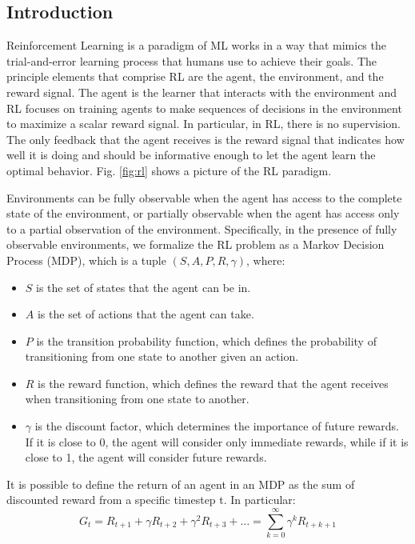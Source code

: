 \subsection{Introduction}
Reinforcement Learning is a paradigm of ML works in a way that mimics the trial-and-error learning process that humans use to achieve their goals.
The principle elements that comprise RL are the agent, the environment, and the reward signal.
The agent is the learner that interacts with the environment and RL focuses on training agents to make sequences of decisions in the environment to maximize a scalar reward signal.
In particular, in RL, there is no supervision.
The only feedback that the agent receives is the reward signal that indicates how well it is doing and should be informative enough to let the agent learn the optimal behavior.
Fig. \ref{fig:rl} shows a picture of the RL paradigm.

Environments can be fully observable when the agent has access to the complete state of the environment, or partially observable when the agent has access only to a partial observation of the environment.
Specifically, in the presence of fully observable environments, we formalize the RL problem as a Markov Decision Process (MDP), which is a tuple $(S, A, P, R, \gamma)$, where:
\begin{itemize}
    \item $S$ is the set of states that the agent can be in.
    \item $A$ is the set of actions that the agent can take.
    \item $P$ is the transition probability function, which defines the probability of transitioning from one state to another given an action.
    \item $R$ is the reward function, which defines the reward that the agent receives when transitioning from one state to another.
    \item $\gamma$ is the discount factor, which determines the importance of future rewards.
    If it is close to 0, the agent will consider only immediate rewards, while if it is close to 1, the agent will consider future rewards.
\end{itemize}

It is possible to define the return of an agent in an MDP as the sum of discounted reward from a specific timestep t.
In particular:
\begin{equation} \label{eq:return}
    G_t = R_{t+1} + \gamma R_{t+2} + \gamma^2 R_{t+3} + \dots = \sum_{k=0}^{\infty} \gamma^k R_{t+k+1}
\end{equation}

